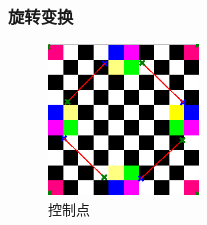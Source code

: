 \documentclass{article}
\begin{document}
		
		\subsubsection{旋转变换}
	
		\begin{figure}[H]
		\begin{center}
			\includegraphics[width=4cm,height=4cm]{input3}
			\caption{控制点} 
		\end{center}
	\end{figure}
	
\end{document}
